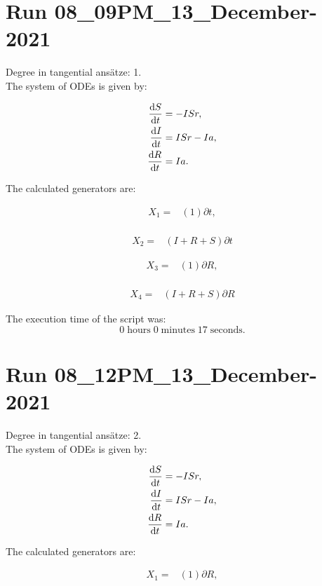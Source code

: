 \section*{Run 08\_09PM\_13\_December-2021}
Degree in tangential ansätze:	1.\\
The system of ODEs is given by:

\begin{align*}
\dv{S}{t}&=- I S r,\\
\dv{I}{t}&=I S r - I a,\\
\dv{R}{t}&=I a.\\
\end{align*}

\noindent The calculated generators are:

\begin{align*}
X_{1}=&\left(1 \right)\partial t,\\
\end{align*}

\begin{align*}
X_{2}=&\left(I+R+S \right)\partial t
\end{align*}

\begin{align*}
X_{3}=&\left(1 \right)\partial R,\\
\end{align*}

\begin{align*}
X_{4}=&\left(I+R+S \right)\partial R
\end{align*}

\noindent The execution time of the script was:
$$0\;\mathrm{hours}\;0\;\mathrm{minutes}\;17 \;\mathrm{seconds}.$$
\section*{Run 08\_12PM\_13\_December-2021}
Degree in tangential ansätze:	2.\\
The system of ODEs is given by:

\begin{align*}
\dv{S}{t}&=- I S r,\\
\dv{I}{t}&=I S r - I a,\\
\dv{R}{t}&=I a.\\
\end{align*}

\noindent The calculated generators are:

\begin{align*}
X_{1}=&\left(1 \right)\partial R,\\
\end{align*}

